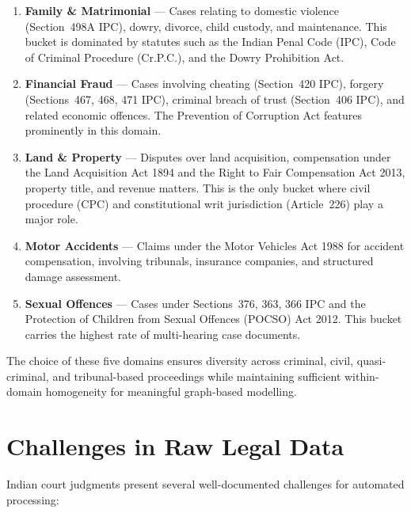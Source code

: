 \begin{enumerate}
    \item \textbf{Family \& Matrimonial} — Cases relating to domestic violence (Section~498A IPC), dowry, divorce, child custody, and maintenance. This bucket is dominated by statutes such as the Indian Penal Code (IPC), Code of Criminal Procedure (Cr.P.C.), and the Dowry Prohibition Act.
    \item \textbf{Financial Fraud} — Cases involving cheating (Section~420 IPC), forgery (Sections~467, 468, 471 IPC), criminal breach of trust (Section~406 IPC), and related economic offences. The Prevention of Corruption Act features prominently in this domain.
    \item \textbf{Land \& Property} — Disputes over land acquisition, compensation under the Land Acquisition Act 1894 and the Right to Fair Compensation Act 2013, property title, and revenue matters. This is the only bucket where civil procedure (CPC) and constitutional writ jurisdiction (Article~226) play a major role.
    \item \textbf{Motor Accidents} — Claims under the Motor Vehicles Act 1988 for accident compensation, involving tribunals, insurance companies, and structured damage assessment.
    \item \textbf{Sexual Offences} — Cases under Sections~376, 363, 366 IPC and the Protection of Children from Sexual Offences (POCSO) Act 2012. This bucket carries the highest rate of multi-hearing case documents.
\end{enumerate}

The choice of these five domains ensures diversity across criminal, civil, quasi-criminal, and tribunal-based proceedings while maintaining sufficient within-domain homogeneity for meaningful graph-based modelling.

\section{Challenges in Raw Legal Data}
\label{sec:challenges}

Indian court judgments present several well-documented challenges for automated processing:

